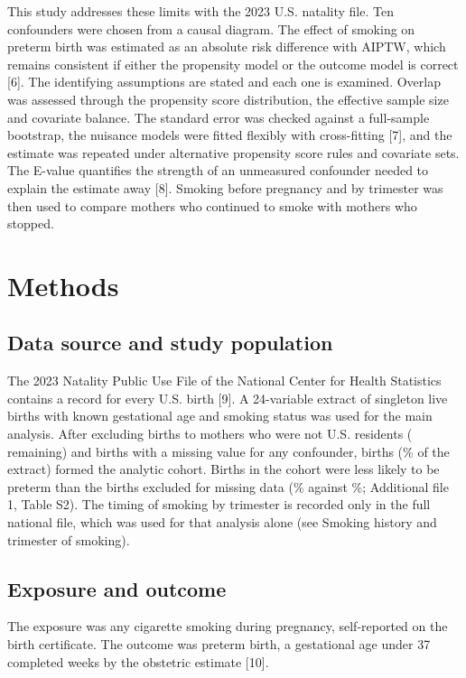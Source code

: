 \documentclass[11pt,letterpaper]{article}
\begin{document}
This study addresses these limits with the 2023 U.S. natality file. Ten confounders were chosen from a causal diagram. The effect of smoking on preterm birth was estimated as an absolute risk difference with AIPTW, which remains consistent if either the propensity model or the outcome model is correct [6]. The identifying assumptions are stated and each one is examined. Overlap was assessed through the propensity score distribution, the effective sample size and covariate balance. The standard error was checked against a full-sample bootstrap, the nuisance models were fitted flexibly with cross-fitting [7], and the estimate was repeated under alternative propensity score rules and covariate sets. The E-value quantifies the strength of an unmeasured confounder needed to explain the estimate away [8]. Smoking before pregnancy and by trimester was then used to compare mothers who continued to smoke with mothers who stopped.

\section*{Methods}

\subsection*{Data source and study population}
The 2023 Natality Public Use File of the National Center for Health Statistics contains a record for every U.S. birth [9]. A 24-variable extract of \NExtract{} singleton live births with known gestational age and smoking status was used for the main analysis. After excluding births to mothers who were not U.S. residents (\NResident{} remaining) and births with a missing value for any confounder, \NTotal{} births (\PctKept{}\% of the extract) formed the analytic cohort. Births in the cohort were less likely to be preterm than the \NDropped{} births excluded for missing data (\KeptPreterm{}\% against \DroppedPreterm{}\%; Additional file 1, Table S2). The timing of smoking by trimester is recorded only in the full national file, which was used for that analysis alone (see Smoking history and trimester of smoking).

\subsection*{Exposure and outcome}
The exposure was any cigarette smoking during pregnancy, self-reported on the birth certificate. The outcome was preterm birth, a gestational age under 37 completed weeks by the obstetric estimate [10].
\end{document}
